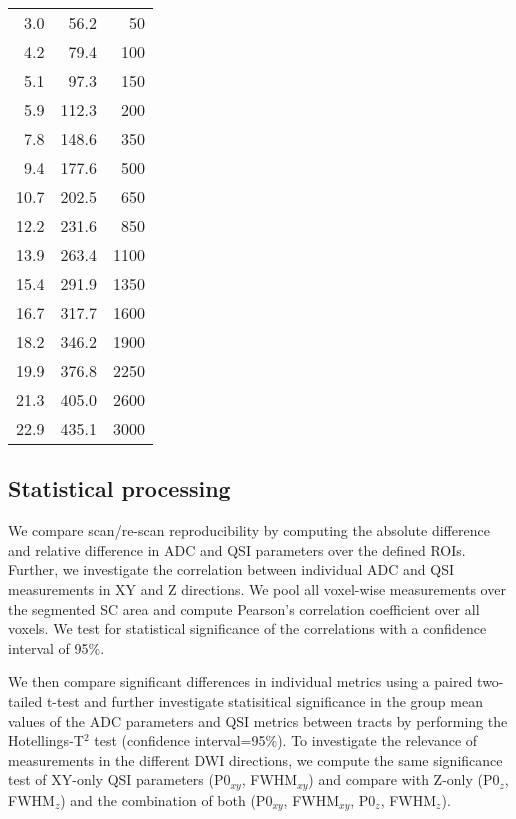 \begin{table}
\begin{adjustbox}{width={0.47\textwidth},keepaspectratio}
\begin{tabular}{rrr}
            3.0   & 56.2  & 50 \\
            4.2   & 79.4  & 100 \\
            5.1   & 97.3  & 150 \\
            5.9   & 112.3 & 200 \\
            7.8   & 148.6 & 350 \\
            9.4   & 177.6 & 500 \\
            10.7  & 202.5 & 650 \\
            12.2  & 231.6 & 850 \\
            13.9  & 263.4 & 1100 \\
            15.4  & 291.9 & 1350 \\
            16.7  & 317.7 & 1600 \\
            18.2  & 346.2 & 1900 \\
            19.9  & 376.8 & 2250 \\
            21.3  & 405.0 & 2600 \\
            22.9  & 435.1 & 3000 \\
            \bottomrule
        \end{tabular}%
     \label{tab:chap5exp1 protocol}
	 \end{adjustbox}
\end{table}

\subsection{Statistical processing} We compare scan/re-scan reproducibility by computing the absolute difference and relative difference in ADC and \gls{QSI} parameters over the defined \glspl{ROI}.
%
%
Further, we investigate the correlation between individual \gls{ADC} and \gls{QSI} measurements in XY and Z directions. We pool all voxel-wise measurements over the segmented \gls{SC} area and compute Pearson's correlation coefficient over all voxels. We test for statistical significance of the correlations with a confidence interval of 95\%.


We then compare significant differences in individual metrics using a paired two-tailed t-test and further investigate statisitical significance in the group mean values of the \gls{ADC} parameters and \gls{QSI} metrics between tracts by performing the Hotellings-T$^2$ test (confidence interval=95\%). To investigate the relevance of measurements in the different \gls{DWI} directions, we compute the same significance test of XY-only \gls{QSI} parameters (P0$_{xy}$, FWHM$_{xy}$) and compare with Z-only (P0$_z$, FWHM$_z$) and the combination of both (P0$_{xy}$, FWHM$_{xy}$, P0$_z$, FWHM$_z$).

